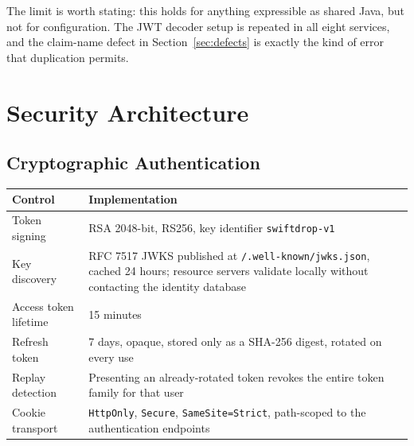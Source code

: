 \documentclass[11pt,a4paper,oneside,openany]{report}
\newcommand{\code}[1]{\texttt{\small #1}}
\begin{document}
The limit is worth stating: this holds for anything expressible as shared Java, but not for
configuration. The JWT decoder setup is repeated in all eight services, and the claim-name defect
in Section~\ref{sec:defects} is exactly the kind of error that duplication permits.

\chapter{Security Architecture}

\section{Cryptographic Authentication}
\begin{center}
\small
\begin{tabular}{@{}p{4.3cm}p{9.9cm}@{}}
\toprule
\textbf{Control} & \textbf{Implementation} \\
\midrule
Token signing & RSA 2048-bit, RS256, key identifier \code{swiftdrop-v1} \\
\addlinespace
Key discovery & RFC 7517 JWKS published at \code{/.well-known/jwks.json}, cached 24 hours;
resource servers validate locally without contacting the identity database \\
\addlinespace
Access token lifetime & 15 minutes \\
\addlinespace
Refresh token & 7 days, opaque, stored only as a SHA-256 digest, rotated on every use \\
\addlinespace
Replay detection & Presenting an already-rotated token revokes the entire token family for that
user \\
\addlinespace
Cookie transport & \code{HttpOnly}, \code{Secure}, \code{SameSite=Strict}, path-scoped to the
authentication endpoints \\
\bottomrule
\end{tabular}
\label{tab:authn}
\end{center}
\end{document}
